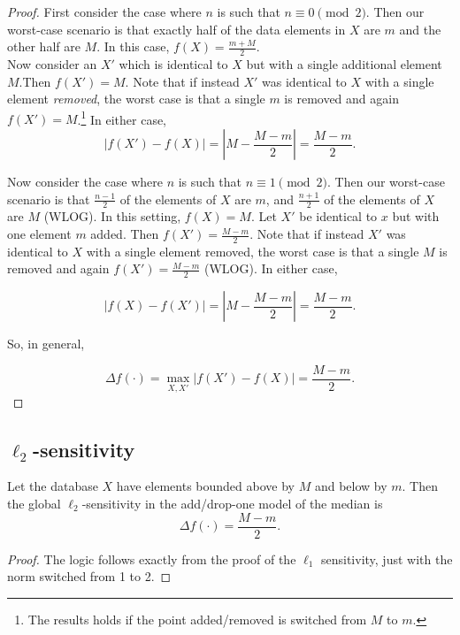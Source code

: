 \documentclass[11pt]{scrartcl} %
\begin{document}
\begin{proof}

First consider the case where $n$ is such that $n \equiv 0 \pmod{2}$. Then our worst-case scenario is that exactly half of the data elements in $X$ are $m$ and the other half are $M$. In this case, $f(X) = \frac{m + M}{2}$. \\

Now consider an $X'$ which is identical to $X$ but with a single additional element $M$.Then $f(X') = M$. Note that if instead $X'$ was identical to $X$ with a single element \textit{removed}, the worst case is that a single $m$ is removed and again $f(X') = M$.\footnote{The results holds if the point added/removed is switched from $M$ to $m$.}  In either case,
$$ \left\vert f(X') - f(X) \right\vert = \left\vert M - \frac{M-m}{2} \right\vert = \frac{M-m}{2}.$$

Now consider the case where $n$ is such that $n \equiv 1 \pmod{2}$.
Then our worst-case scenario is that $\frac{n-1}{2}$ of the elements of $X$ are $m$, and $\frac{n+1}{2}$ of the elements of $X$ are $M$ (WLOG). In this setting, $f(X) = M$. Let $X'$ be identical to $x$ but with one element $m$ added. Then $f(X') = \frac{M-m}{2}$. Note that if instead $X'$ was identical to $X$ with a single element removed, the worst case is that a single $M$ is removed and again $f(X') = \frac{M-m}{2}$ (WLOG). In either case, 

$$ \left\vert f(X) - f(X') \right\vert = \left\vert M - \frac{M-m}{2} \right\vert = \frac{M-m}{2}.$$ 

So, in general, 

$$ \Delta f(\cdot) = \max_{X,X'} \left\vert f(X') - f(X) \right\vert = \frac{M-m}{2}. $$
\end{proof}

\subsection{$\ell_2$-sensitivity}

\begin{theorem}
Let the database $X$ have elements bounded above by $M$ and below by $m$. Then the global $\ell_2$-sensitivity in the add/drop-one model of the median is
$$ \Delta f(\cdot) = \frac{M-m}{2}.$$
\end{theorem}

\begin{proof}
The logic follows exactly from the proof of the $\ell_1$ sensitivity, just with the norm switched from 1 to 2.

\end{proof}
\end{document}
